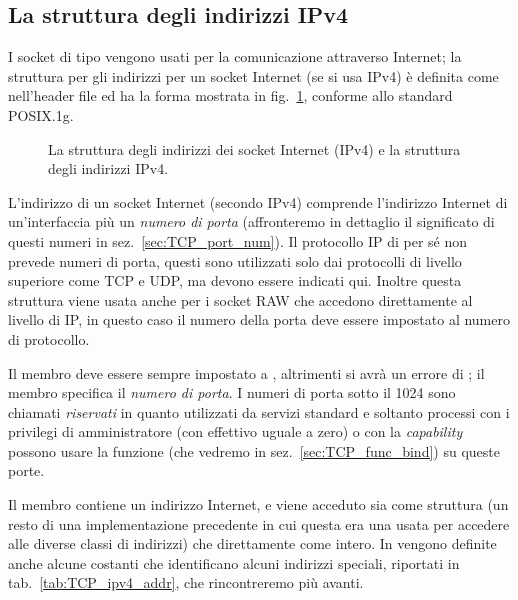 \subsection{La struttura degli indirizzi IPv4}
\label{sec:sock_sa_ipv4}

I socket di tipo  vengono usati per la comunicazione
attraverso Internet; la struttura per gli indirizzi per un socket Internet (se
si usa IPv4) è definita come  nell'header file
 ed ha la forma mostrata in
fig.~\ref{fig:sock_sa_ipv4_struct}, conforme allo standard POSIX.1g.

\begin{figure}[!htb]
  \footnotesize\centering
  \begin{minipage}[c]{0.80\textwidth}
  \end{minipage} 
  \caption{La struttura  degli indirizzi dei socket
    Internet (IPv4) e la struttura  degli indirizzi IPv4.}
  \label{fig:sock_sa_ipv4_struct}
\end{figure}

L'indirizzo di un socket Internet (secondo IPv4) comprende l'indirizzo
Internet di un'interfaccia più un \textsl{numero di porta} (affronteremo in
dettaglio il significato di questi numeri in sez.~\ref{sec:TCP_port_num}).  Il
protocollo IP di per sé non prevede numeri di porta, questi sono utilizzati
solo dai protocolli di livello superiore come TCP e UDP, ma devono essere
indicati qui. Inoltre questa struttura viene usata anche per i socket RAW che
accedono direttamente al livello di IP, in questo caso il numero della porta
deve essere impostato al numero di protocollo.

Il membro  deve essere sempre impostato a ,
altrimenti si avrà un errore di ; il membro 
specifica il \textsl{numero di porta}. I numeri di porta sotto il 1024 sono
chiamati \textsl{riservati} in quanto utilizzati da servizi standard e
soltanto processi con i privilegi di amministratore (con  effettivo
uguale a zero) o con la \textit{capability} 
possono usare la funzione  (che vedremo in
sez.~\ref{sec:TCP_func_bind}) su queste porte.

Il membro  contiene un indirizzo Internet, e viene acceduto sia
come struttura (un resto di una implementazione precedente in cui questa era
una  usata per accedere alle diverse classi di indirizzi) che
direttamente come intero. In  vengono definite anche
alcune costanti che identificano alcuni indirizzi speciali, riportati in
tab.~\ref{tab:TCP_ipv4_addr}, che rincontreremo più avanti.

